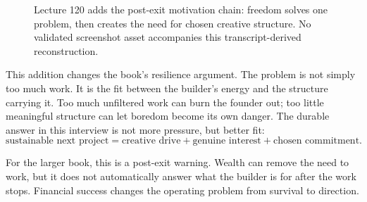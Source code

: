 \documentclass[11pt,oneside]{book}
\begin{document}
\begin{figure}
\centering
{}
\caption{Lecture 120 adds the post-exit motivation chain: freedom solves one problem, then creates the need for chosen creative structure. No validated screenshot asset accompanies this transcript-derived reconstruction.}
\end{figure}

This addition changes the book's resilience argument. The problem is not simply too much work. It is the fit between the builder's energy and the structure carrying it. Too much unfiltered work can burn the founder out; too little meaningful structure can let boredom become its own danger. The durable answer in this interview is not more pressure, but better fit:
\[
\text{sustainable next project}
=
\text{creative drive}
+
\text{genuine interest}
+
\text{chosen commitment}.
\]

For the larger book, this is a post-exit warning. Wealth can remove the need to work, but it does not automatically answer what the builder is for after the work stops. Financial success changes the operating problem from survival to direction.

\end{document}

